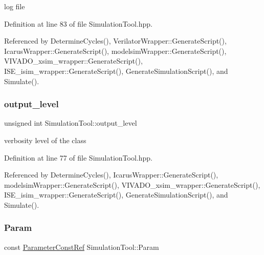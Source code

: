 log file 



Definition at line 83 of file Simulation\+Tool.\+hpp.



Referenced by Determine\+Cycles(), Verilator\+Wrapper\+::\+Generate\+Script(), Icarus\+Wrapper\+::\+Generate\+Script(), modelsim\+Wrapper\+::\+Generate\+Script(), V\+I\+V\+A\+D\+O\+\_\+xsim\+\_\+wrapper\+::\+Generate\+Script(), I\+S\+E\+\_\+isim\+\_\+wrapper\+::\+Generate\+Script(), Generate\+Simulation\+Script(), and Simulate().

\mbox{\label{classSimulationTool_a0fe2cf8bf40f059b60f6d1b84ad391ac}} 
\subsubsection{\texorpdfstring{output\+\_\+level}{output\_level}}
{\footnotesize\ttfamily unsigned int Simulation\+Tool\+::output\+\_\+level\hspace{0.3cm}{\ttfamily [protected]}}



verbosity level of the class 



Definition at line 77 of file Simulation\+Tool.\+hpp.



Referenced by Determine\+Cycles(), Icarus\+Wrapper\+::\+Generate\+Script(), modelsim\+Wrapper\+::\+Generate\+Script(), V\+I\+V\+A\+D\+O\+\_\+xsim\+\_\+wrapper\+::\+Generate\+Script(), I\+S\+E\+\_\+isim\+\_\+wrapper\+::\+Generate\+Script(), Generate\+Simulation\+Script(), and Simulate().

\mbox{\label{classSimulationTool_adc409fd8f18901e2d0ea4a6ab6690138}} 
\subsubsection{\texorpdfstring{Param}{Param}}
{\footnotesize\ttfamily const \hyperlink{Parameter_8hpp_a37841774a6fcb479b597fdf8955eb4ea}{Parameter\+Const\+Ref} Simulation\+Tool\+::\+Param\hspace{0.3cm}{\ttfamily [protected]}}



